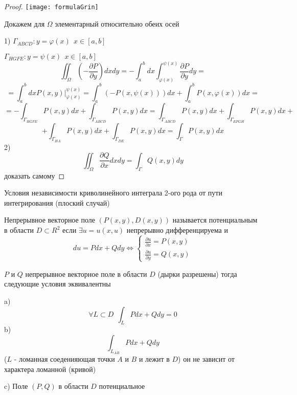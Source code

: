 \begin{proof}
  \texttt{[image: formulaGrin]}

  Докажем для $\Omega$ элементарный относительно обеих осей

  1)
  $\Gamma_{ABCD}: y = \varphi(x) ~~ x \in [a,b]$

  $\Gamma_{HGFE}: y = \psi(x) ~~ x \in [a,b]$
  $$
  \iint_{\Omega} \left( -\frac{\partial P}{\partial y} \right) dx dy =
  -\int_a^b dx \int_{\varphi(x)}^{\psi(x)} \frac{\partial P}{\partial y} dy =
  $$
  $$
  = \int_a^b dx P(x,y) |_{\varphi(x)}^{\psi(x)} = \int_a^b(-P(x, \psi(x)))dx +
  \int_a^b P(x, \varphi(x)) dx =
  $$
  $$
  = -\int_{\Gamma_{HGFE}} P(x, y) dx + \int_{\Gamma_{ABCD}} P(x,y)dx =
  \int_{\Gamma_{ABCD}} P(x,y)dx + \int_{\Gamma_{EFGH}} P(x,y)dx +
  $$
  $$
  + \int_{\Gamma_{HA}} P(x, y)dx + \int_{\Gamma_{DE}} P(x,y) dx =
  \int_{\Gamma} P(x,y) dx
  $$
  2)
  $$
  \iint_{\Omega} \frac{\partial Q}{\partial x} dx dy = \int_{\Gamma} Q(x,y)dy
  $$
  доказать самому
\end{proof}

\begin{title}[\Large]
  Условия независимости криволинейного интеграла 2-ого рода от пути
  интегрирования (плоский случай)
\end{title}

\begin{define}
  Непрерывное векторное поле $(P(x,y), D(x,y))$ называется потенциальным в
  области $D \subset R^2$ если $\exists u = u(x,u)$ непрерывно дифференцируема
  и
  $$
  du = Pdx + Qdy \Leftrightarrow
  \left\{
  \begin{array}{c}
    \frac{\partial u}{\partial x} = P(x, y) \\

    \frac{\partial u}{\partial y} = Q(x, y)
  \end{array}
  \right.
  $$
\end{define}

\begin{theorem}
  $P$ и $Q$ непрерывное векторное поле в области $D$ (дырки разрешены) тогда
  следующие условия эквивалентны

  a)
  $$
  \forall L \subset D ~~ \int_L Pdx + Qdy = 0
  $$
  b)
  $$
  \int_{L_{AB}} Pdx + Qdy
  $$
  ($L$ - ломанная соеденияющая точки $A$ и $B$ и лежит в $D$)
  он не зависит от характера ломанной (кривой)

  c) Поле $(P, Q)$ в области $D$ потенциальное
\end{theorem}

